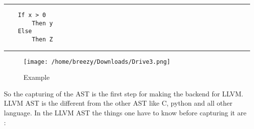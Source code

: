 \documentclass{book}
\begin{document}
\noindent\rule{12cm}{0.4pt}

\begin{verbatim}
	If x > 0
		Then y
	Else
		Then Z 	
\end{verbatim}

\noindent\rule{12cm}{0.4pt} \newline


\begin{figure}
	\texttt{[image: /home/breezy/Downloads/Drive3.png]}
	\caption{Example}
	\label{fig:3.1}
\end{figure}

So the capturing of the AST is the first step for making the backend for LLVM. LLVM AST is the different from the other AST like C, python and all other language. In the LLVM AST the things one have to know before capturing it are :
\end{document}
